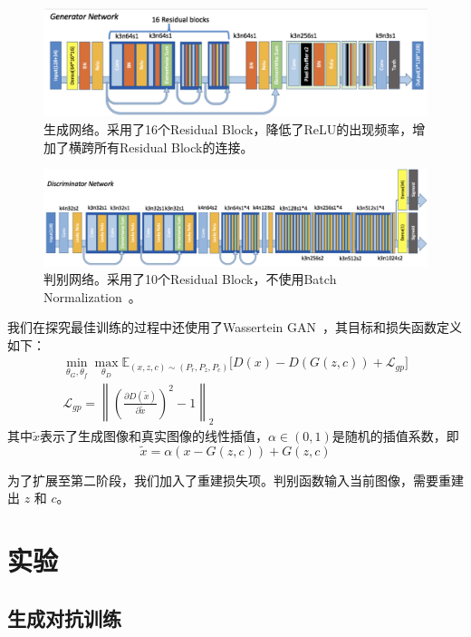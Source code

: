 \documentclass[a4paper,12pt,UTF8]{ctexart}
\newcommand{\norm}[1]{\left\lVert#1\right\rVert}
\newcommand{\kai}{\CJKfamily{zhkai}}	%
\begin{document}
\begin{figure}[H]
  \centering
  \includegraphics[width=1\linewidth]{figs/g_net_moe.png}
  \caption{\kai 生成网络。采用了16个Residual Block，降低了ReLU的出现频率，增加了横跨所有Residual Block的连接。}
  \label{fig:generator}
\end{figure}
\begin{figure}[H]
  \centering
  \includegraphics[width=1\linewidth]{figs/mod_disc.png}
  \caption{\kai 判别网络。采用了10个Residual Block，不使用Batch Normalization~\cite{ioffe2015batch}。}
  \label{fig:discriminator}
\end{figure}

我们在探究最佳训练的过程中还使用了Wassertein GAN~\cite{2017arXiv170107875A}，其目标和损失函数定义如下：
%
\begin{align}
  \min_{\theta_G,\theta_f} \max_{\theta_D} \mathbb{E}_{(x, z, c) \sim (P_r, P_z, P_c)} \Big[ D(x) - D(G(z, c)) + \mathcal{L}_{gp} \Big] \\
  \mathcal{L}_{gp} = \norm{\left(\frac{\partial D(\tilde x)}{\partial \tilde x}\right)^2 - 1 }_2
\end{align}
%
其中$\tilde x$表示了生成图像和真实图像的线性插值，$\alpha \in (0, 1)$是随机的插值系数，即
%
\begin{equation}
  \tilde x = \alpha (x - G(z, c)) + G(z, c)
\end{equation}

为了扩展至第二阶段，我们加入了重建损失项。判别函数输入当前图像，需要重建出 $z$ 和 $c$。

\section{实验}

\subsection{生成对抗训练}
\end{document}
